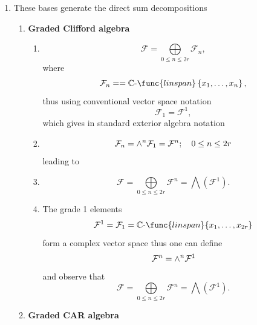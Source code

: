 \documentclass[aps,preprint]{revtex4}
\begin{document}
\begin{enumerate}
\item These bases generate the direct sum decompositions

\begin{enumerate}
\item \textbf{Graded Clifford algebra}

\begin{enumerate}
\item 
\begin{equation}
\mathcal{F}=\bigoplus\limits_{0\leq n\leq 2r}\mathcal{F}_{n},
\end{equation}%
where 
\begin{equation}
\mathcal{F}_{n}==\mathbb{C}\text{-}\func{linspan}\left\{ x_{1},\ldots
,x_{n}\right\} ,
\end{equation}%
thus using conventional vector space notation 
\begin{equation}
\mathcal{F}_{1}=\mathcal{F}^{1},
\end{equation}%
which gives in standard exterior algebra notation

\item 
\begin{equation}
\mathcal{F}_{n}={\Huge \wedge }^{n}\mathcal{F}_{1}=\mathcal{F}^{n};\quad
0\leq n\leq 2r
\end{equation}%
leading to

\item 
\begin{equation}
\mathcal{F}=\bigoplus\limits_{0\leq n\leq 2r}\mathcal{F}^{n}=\bigwedge
\left( \mathcal{F}^{1}\right) .
\end{equation}

\item The grade 1 elements 
\begin{equation}
\mathcal{F}^{1}=\mathcal{F}_{1}=\mathbb{C}\text{-}\func{linspan}%
\{x_{1},\ldots ,x_{2r}\}
\end{equation}%
form a complex vector space thus one can define 
\begin{equation}
\mathcal{F}^{n}={\Huge \wedge }^{n}\mathcal{F}^{1}
\end{equation}%
and observe that 
\begin{equation}
\mathcal{F}=\bigoplus\limits_{0\leq n\leq 2r}\mathcal{F}^{n}=\bigwedge
\left( \mathcal{F}^{1}\right) .
\end{equation}
\end{enumerate}

\item \textbf{Graded CAR algebra}


\end{enumerate}
\end{enumerate}
\end{document}
